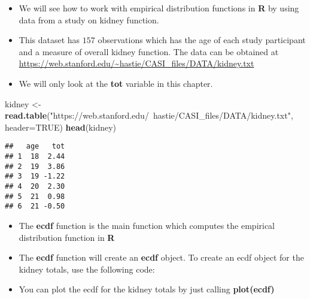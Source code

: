 \documentclass[]{book}
\newenvironment{Shaded}{\begin{snugshade}}{\end{snugshade}}
\newcommand{\DataTypeTok}[1]{\textcolor[rgb]{0.13,0.29,0.53}{#1}}
\newcommand{\KeywordTok}[1]{\textcolor[rgb]{0.13,0.29,0.53}{\textbf{#1}}}
\newcommand{\NormalTok}[1]{#1}
\newcommand{\OperatorTok}[1]{\textcolor[rgb]{0.81,0.36,0.00}{\textbf{#1}}}
\newcommand{\OtherTok}[1]{\textcolor[rgb]{0.56,0.35,0.01}{#1}}
\newcommand{\StringTok}[1]{\textcolor[rgb]{0.31,0.60,0.02}{#1}}
\providecommand{\tightlist}{%
  \setlength{\itemsep}{0pt}\setlength{\parskip}{0pt}}
\begin{document}
\begin{itemize}
\item
  We will see how to work with empirical distribution functions in \textbf{R} by using data
  from a study on kidney function.
\item
  This dataset has \(157\) observations which has the age of each study participant and
  a measure of overall kidney function. The data can be obtained at \url{https://web.stanford.edu/~hastie/CASI_files/DATA/kidney.txt}
\item
  We will only look at the \textbf{tot} variable in this chapter.
\end{itemize}

\begin{Shaded}
\begin{Highlighting}[]
\NormalTok{kidney <-}\StringTok{ }\KeywordTok{read.table}\NormalTok{(}\StringTok{"https://web.stanford.edu/~hastie/CASI_files/DATA/kidney.txt"}\NormalTok{, }
                     \DataTypeTok{header=}\OtherTok{TRUE}\NormalTok{)}
\KeywordTok{head}\NormalTok{(kidney)}
\end{Highlighting}
\end{Shaded}

\begin{verbatim}
##   age   tot
## 1  18  2.44
## 2  19  3.86
## 3  19 -1.22
## 4  20  2.30
## 5  21  0.98
## 6  21 -0.50
\end{verbatim}

\begin{itemize}
\item
  The \textbf{ecdf} function is the main function which computes the empirical distribution function
  in \textbf{R}
\item
  The \textbf{ecdf} function will create an \textbf{ecdf} object. To create an ecdf object
  for the kidney totals, use the following code:
\end{itemize}

\begin{Shaded}
\end{Shaded}

\begin{itemize}
\tightlist
\item
  You can plot the ecdf for the kidney totals by just calling \textbf{plot(ecdf)}
\end{itemize}
\end{document}
